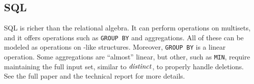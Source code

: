 %
%
%
%
%

\subsection{SQL}

SQL is richer than the relational algebra.  It can perform operations
on multisets, and it offers operations such as \texttt{GROUP BY} and
aggregations.  All of these can be modeled as operations on \zr-like
structures.  Moreover, \texttt{GROUP BY} is a linear operation.  Some
aggregations are ``almost'' linear, but other, such as \texttt{MIN},
require maintaining the full input set, similar to $\mathit{distinct}$, to
properly handle deletions.  See the full paper and the technical
report for more details.

